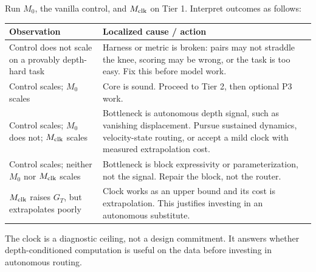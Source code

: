 \documentclass[11pt]{article}
\begin{document}
Run \(M_0\), the vanilla control, and \(M_{\rm clk}\) on Tier 1.  Interpret outcomes as follows:
\renewcommand{\arraystretch}{1.2}
\begin{center}
\footnotesize
\begin{tabularx}{\textwidth}{@{}L{0.46\textwidth} L{0.46\textwidth}@{}}
\toprule
\textbf{Observation} & \textbf{Localized cause / action} \\
\midrule
Control does not scale on a provably depth-hard task & Harness or metric is broken: pairs may not straddle the knee, scoring may be wrong, or the task is too easy.  Fix this before model work. \\
Control scales; \(M_0\) scales & Core is sound.  Proceed to Tier 2, then optional P3 work. \\
Control scales; \(M_0\) does not; \(M_{\rm clk}\) scales & Bottleneck is autonomous depth signal, such as vanishing displacement.  Pursue sustained dynamics, velocity-state routing, or accept a mild clock with measured extrapolation cost. \\
Control scales; neither \(M_0\) nor \(M_{\rm clk}\) scales & Bottleneck is block expressivity or parameterization, not the signal.  Repair the block, not the router. \\
\(M_{\rm clk}\) raises \(G_T\), but extrapolates poorly & Clock works as an upper bound and its cost is extrapolation.  This justifies investing in an autonomous substitute. \\
\bottomrule
\end{tabularx}
\end{center}
The clock is a diagnostic ceiling, not a design commitment.  It answers whether depth-conditioned
computation is useful on the data before investing in autonomous routing.
\end{document}
